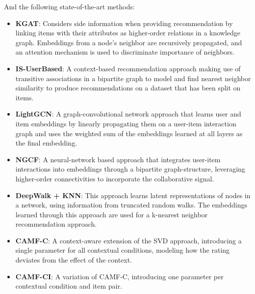 And the following state-of-the-art methods:
\begin{itemize}
    \item \textbf{KGAT}: Considers side information when providing recommendation by linking items with their attributes as higher-order relations in a knowledge graph. Embeddings from a node's neighbor are recursively propagated, and an attention mechanism is used to discriminate importance of neighbors.
    \item \textbf{IS-UserBased}: A context-based recommendation approach making use of transitive associations in a bipartite graph to model and find nearest neighbor similarity to produce recommendations on a dataset that has been split on items.
    \item \textbf{LightGCN}: A graph-convolutional network approach that learns user and item embeddings by linearly propagating them on a user-item interaction graph and uses the weighted sum of the embeddings learned at all layers as the final embedding.
    \item \textbf{NGCF}: A neural-network based approach that integrates user-item interactions into embeddings through a bipartite graph-structure, leveraging higher-order connectivities to incorporate the collaborative signal.
    \item \textbf{DeepWalk + KNN}: This approach learns latent representations of nodes in a network, using information from truncated random walks. The embeddings learned through this approach are used for a k-nearest neighbor recommendation approach.
    \item \textbf{CAMF-C}: A context-aware extension of the SVD approach, introducing a single parameter for all contextual conditions, modeling how the rating deviates from the effect of the context.
    \item \textbf{CAMF-CI}: A variation of CAMF-C, introducing one parameter per contextual condition and item pair.
\end{itemize}
